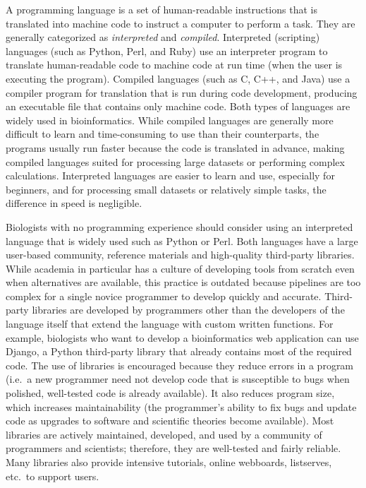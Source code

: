 \documentclass[ChapterTOCs,krantz2]{krantz} %
\begin{document}
A programming language is a set of human-readable instructions that is translated into
machine code to instruct a computer to perform a task.
They are generally categorized as \emph{interpreted} and \emph{compiled}.
Interpreted (scripting) languages (such as Python, Perl, and Ruby) use an
interpreter program to translate human-readable
code to machine code at run time (when the user is executing the
program). Compiled languages (such as C, C++, and Java)
use a compiler program for translation that is run 
during code development, producing an executable file that
contains only machine code. Both types of languages are widely used in
bioinformatics. While compiled languages are generally more difficult to learn
and time-consuming to use than their counterparts, the 
programs usually run faster because the code is translated in advance,
making compiled languages suited for processing large
datasets or performing complex calculations. Interpreted languages are
easier to learn and use, especially for beginners, and for processing 
small datasets or relatively simple
tasks, the difference in speed is negligible. 

Biologists with no programming experience should consider using an interpreted
language that is widely used such as Python or Perl.
Both languages have a large user-based community, reference materials and
high-quality third-party libraries.
While academia in particular has a culture of 
developing tools from scratch even when alternatives are available, this practice
is outdated because pipelines are too complex for a single novice programmer 
to develop quickly and accurate\cite{Wilson2006}. Third-party libraries are developed 
by programmers other than the developers of the language itself that extend the language
with custom written functions.  For example,   
biologists who want to develop a bioinformatics web application 
can use Django, a Python third-party library that already contains most of the required 
code.  The use of libraries is encouraged because they
reduce errors in a program (i.e.\ a new programmer need not 
develop code that is susceptible to bugs when
polished, well-tested code is already available). It also reduces program size, 
which increases maintainability (the programmer's ability to fix 
bugs and update code as upgrades to software and scientific theories
become available).
Most libraries are actively maintained, developed, and used
by a community of programmers and scientists; therefore, they are well-tested
and fairly reliable. Many libraries also provide intensive tutorials, online
webboards, listserves, etc.\ to support users. 
\end{document}
